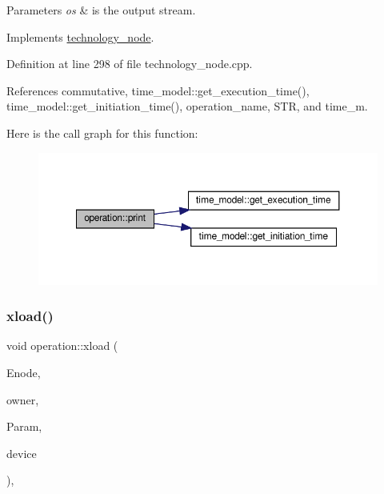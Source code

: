\begin{DoxyParams}{Parameters}
{\em os} & is the output stream. \\
\hline
\end{DoxyParams}


Implements \hyperlink{structtechnology__node_a44f347bae9b9b59726f323b5a6ad9ebf}{technology\+\_\+node}.



Definition at line 298 of file technology\+\_\+node.\+cpp.



References commutative, time\+\_\+model\+::get\+\_\+execution\+\_\+time(), time\+\_\+model\+::get\+\_\+initiation\+\_\+time(), operation\+\_\+name, S\+TR, and time\+\_\+m.

Here is the call graph for this function\+:
\nopagebreak
\begin{figure}[H]
\begin{center}
\leavevmode
\includegraphics[width=350pt]{d9/dc0/structoperation_a48582638c55f54db175299d504459f70_cgraph}
\end{center}
\end{figure}
\mbox{\label{structoperation_a7a8e56978864cac9d8f6c4f9391aa05a}} 
\subsubsection{\texorpdfstring{xload()}{xload()}}
{\footnotesize\ttfamily void operation\+::xload (\begin{DoxyParamCaption}\item[{const \hyperlink{classxml__element}{xml\+\_\+element} $\ast$}]{Enode,  }\item[{const \hyperlink{technology__node_8hpp_a33dd193b7bd6b987bf0d8a770a819fa7}{technology\+\_\+node\+Ref}}]{owner,  }\item[{const \hyperlink{Parameter_8hpp_a37841774a6fcb479b597fdf8955eb4ea}{Parameter\+Const\+Ref}}]{Param,  }\item[{const \hyperlink{target__device_8hpp_acedb2b7a617e27e6354a8049fee44eda}{target\+\_\+device\+Ref}}]{device }\end{DoxyParamCaption})\hspace{0.3cm}{\ttfamily [override]}, {\ttfamily [virtual]}}




